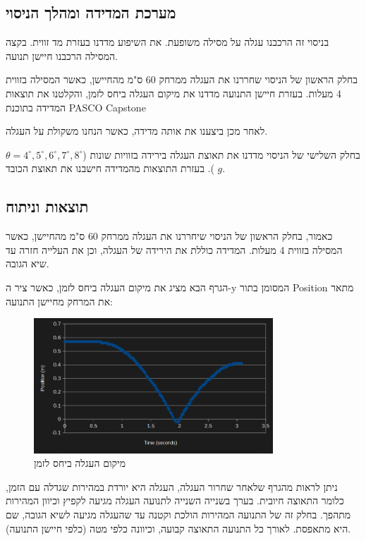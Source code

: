 \documentclass[14pt]{extarticle}
\begin{document}
\subsection*{מערכת המדידה ומהלך הניסוי}
בניסוי זה הרכבנו עגלה על מסילה משופעת. את השיפוע מדדנו בעזרת מד זווית. בקצה המסילה הרכבנו חיישן תנועה.

בחלק הראשון של הניסוי שחררנו את העגלה ממרחק 60 ס"מ מהחיישן, כאשר המסילה בזווית 4 מעלות.
בעזרת חיישן התנועה מדדנו את מיקום העגלה ביחס לזמן, והקלטנו את תוצאות המדידה בתוכנת PASCO Capstone

לאחר מכן ביצענו את אותה מדידה, כאשר הנחנו משקולת על העגלה.

בחלק השלישי של הניסוי מדדנו את תאוצת העגלה בירידה בזוויות שונות ($\theta = 4^\circ, 5^\circ, 6^\circ, 7^\circ, 8^\circ$).
בעזרת התוצאות מהמדידה חישבנו את תאוצת הכובד $g$.

\subsection*{תוצאות וניתוח}
כאמור, בחלק הראשון של הניסוי שיחררנו את העגלה ממרחק 60 ס"מ מהחיישן, כאשר המסילה בזווית 4 מעלות.
המדידה כוללת את הירידה של העגלה, וכן את העלייה חזרה עד שיא הגובה.

הגרף הבא מציג את מיקום העגלה ביחס לזמן, כאשר ציר ה-y המסומן בתור Position
מתאר את המרחק מחיישן התנועה:
\begin{figure}[H]
    \centering
    \includegraphics[width=0.8\textwidth]{maman_13_experiment_2_position_time_4_degrees_no_weight.png}
    \caption{מיקום העגלה ביחס לזמן}
\end{figure}

ניתן לראות מהגרף שלאחר שחרור העגלה, העגלה היא יורדת במהירות שגדלה עם הזמן, כלומר התאוצה חיובית.
בערך בשנייה השנייה לתנועה העגלה מגיעה לקפיץ וכיוון המהירות מתהפך. בחלק זה של התנועה המהירות הולכת וקטנה עד שהעגלה מגיעה לשיא הגובה, שם היא מתאפסת. 
לאורך כל התנועה התאוצה קבועה, וכיוונה כלפי מטה (כלפי חיישן התנועה).
\end{document}
